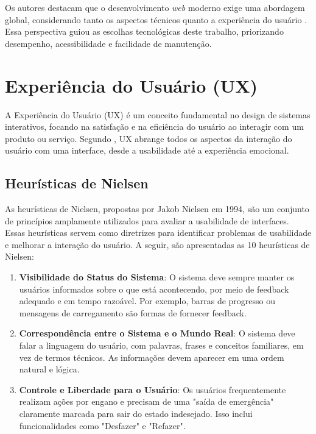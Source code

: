 {    Os autores destacam que o desenvolvimento \textit{web} moderno exige uma abordagem global, considerando tanto os aspectos técnicos quanto a experiência do usuário \citep{queirosintrodução}. Essa perspectiva guiou as escolhas tecnológicas deste trabalho, priorizando desempenho, acessibilidade e facilidade de manutenção.
    
    \section{Experiência do Usuário (UX)}
    A Experiência do Usuário (UX) é um conceito fundamental no design de sistemas interativos, focando na satisfação e na eficiência do usuário ao interagir com um produto ou serviço. Segundo \cite{Norman}, UX abrange todos os aspectos da interação do usuário com uma interface, desde a usabilidade até a experiência emocional.
    
    \subsection{Heurísticas de Nielsen}
    As heurísticas de Nielsen, propostas por Jakob Nielsen em 1994, são um conjunto de princípios amplamente utilizados para avaliar a usabilidade de interfaces. Essas heurísticas servem como diretrizes para identificar problemas de usabilidade e melhorar a interação do usuário. A seguir, são apresentadas as 10 heurísticas de Nielsen:
    
    \begin{enumerate}
        \item \textbf{Visibilidade do Status do Sistema}: O sistema deve sempre manter os usuários informados sobre o que está acontecendo, por meio de feedback adequado e em tempo razoável. Por exemplo, barras de progresso ou mensagens de carregamento são formas de fornecer feedback.
    
        \item \textbf{Correspondência entre o Sistema e o Mundo Real}: O sistema deve falar a linguagem do usuário, com palavras, frases e conceitos familiares, em vez de termos técnicos. As informações devem aparecer em uma ordem natural e lógica.
    
        \item \textbf{Controle e Liberdade para o Usuário}: Os usuários frequentemente realizam ações por engano e precisam de uma "saída de emergência" claramente marcada para sair do estado indesejado. Isso inclui funcionalidades como "Desfazer" e "Refazer".
    

\end{enumerate}}
